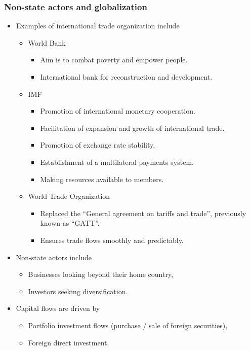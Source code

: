 \documentclass[../notes_compiled.tex]{subfiles}
\begin{document}
\subsubsection{Non-state actors and globalization}
\begin{itemize}
\item Examples of international trade organization include
\begin{itemize}
\item World Bank
\begin{itemize}
\item Aim is to combat poverty and empower people.
\item International bank for reconstruction and development.
\end{itemize}
\item IMF
\begin{itemize}
\item Promotion of international monetary cooperation.
\item Facilitation of expansion and growth of international trade.
\item Promotion of exchange rate stability.
\item Establishment of a multilateral payments system.
\item Making resources available to members.
\end{itemize}
\item World Trade Organization
\begin{itemize}
\item Replaced the ``General agreement on tariffs and trade'', previously known as ``GATT''.
\item Ensures trade flows smoothly and predictably.
\end{itemize}
\end{itemize}

\item Non-state actors include
\begin{itemize}
\item Businesses looking beyond their home country,
\item Investors seeking diversification.
\end{itemize}

\item Capital flows are driven by
\begin{itemize}
\item Portfolio investment flows (purchase / sale of foreign securities),
\item Foreign direct investment.
\end{itemize}
\end{itemize}
\end{document}
